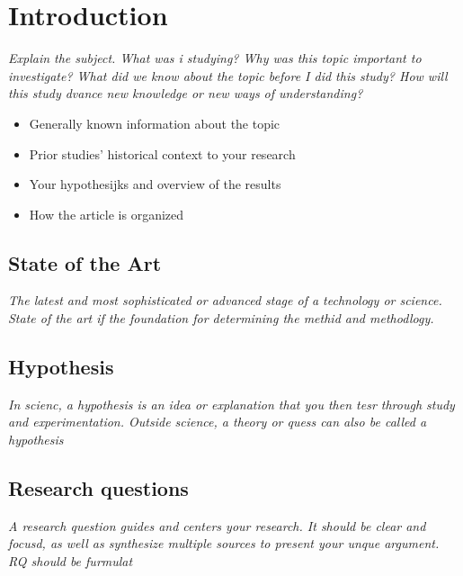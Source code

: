 
\section{Introduction}
\textit{Explain the subject. What was i studying? Why was this topic important to investigate? What did we know about the topic before I did this study? How will this study dvance new knowledge or new ways of understanding?}
\begin{itemize}
    \item Generally known information about the topic
    \item Prior studies' historical context to your research
    \item Your hypothesijks and overview of the results
    \item How the article is organized
\end{itemize}
\subsection{State of the Art}
\textit{The latest and most sophisticated or advanced stage of a technology or science. State of the art if the foundation for determining the methid and methodlogy.}
\subsection{Hypothesis}
\textit{In scienc, a hypothesis is an idea or explanation that you then tesr through study and experimentation. Outside science, a theory or quess can also be called a hypothesis}
\subsection{Research questions}
\textit{A research question guides and centers your research. It should be clear and focusd, as well as synthesize multiple sources to present your unque argument. RQ should be furmulat}
